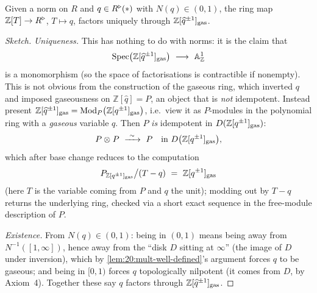 \begin{proposition}
\label{prop:20:gaseous-factorization}
Given a norm on $R$ and $q\in R^{\triangleright}(\ast)$ with $N(q)\in(0,1)$, the ring map
$\mathbb Z[T]\to R^{\triangleright}$, $T\mapsto q$, factors uniquely through
$\mathbb Z[\widehat q^{\pm1}]_{\mathrm{gas}}$.
\end{proposition}

\begin{proof}[Sketch]
\emph{Uniqueness.} This has nothing to do with norms: it is the claim that
\begin{equation*}
\mathrm{Spec}\bigl(\mathbb Z[\widehat q^{\pm1}]_{\mathrm{gas}}\bigr)\ \longrightarrow\
\mathbb A^1_{\mathbb Z}
\end{equation*}
is a monomorphism (so the space of factorisations is contractible if nonempty).
This is not obvious from the construction of the gaseous ring, which inverted $q$
and imposed gaseousness on $\mathbb Z[\widehat q]=P$, an object that is
\emph{not} idempotent. Instead present
$\mathbb Z[\widehat q^{\pm1}]_{\mathrm{gas}}=\operatorname{Mod}_P\bigl(\mathbb Z[q^{\pm1}]_{\mathrm{gas}}\bigr)$,
i.e.\ view it as $P$-modules in the polynomial ring with a \emph{gaseous}
variable $q$. Then $P$ \emph{is} idempotent in $D(\mathbb Z[q^{\pm1}]_{\mathrm{gas}})$:
\begin{equation*}
P\otimes^{}_{}P\ \xrightarrow{\ \sim\ }\ P
\quad\text{in }D\bigl(\mathbb Z[q^{\pm1}]_{\mathrm{gas}}\bigr),
\end{equation*}
which after base change reduces to the computation
\begin{equation*}
P_{\mathbb Z[q^{\pm1}]_\gasx}\big/(T-q)\ =\ \mathbb Z[q^{\pm1}]_\gasx
\end{equation*}
(here $T$ is the variable coming from $P$ and $q$ the unit); modding out by
$T-q$ returns the underlying ring, checked via a short exact sequence in the
free-module description of $P$.

\emph{Existence.} From $N(q)\in(0,1)$: being in $(0,1)$ means being away from
$N^{-1}([1,\infty])$, hence away from the ``disk $D$ sitting at $\infty$''
(the image of $D$ under inversion), which by \cref{lem:20:mult-well-defined}'s
argument forces $q$ to be gaseous; and being in $[0,1)$ forces $q$ topologically
nilpotent (it comes from $D$, by Axiom~4). Together these say $q$ factors through
$\mathbb Z[\widehat q^{\pm1}]_{\mathrm{gas}}$. \qedhere
\end{proof}

